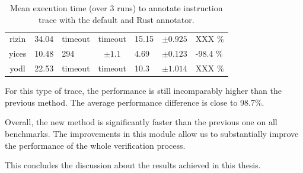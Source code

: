 \begin{table}[h]
{\begin{tabular}{ccgcgcg}
            rizin                                & 34.04                                & timeout                                   & timeout                                & 15.15                     & $ \pm 0.925 $ & XXX \%    \\
            yices                                & 10.48                                & 294                                       & $ \pm 1.1 $                            & 4.69                      & $ \pm 0.123 $ & -98.4 \%  \\
            yodl                                 & 22.53                                & timeout                                   & timeout                                & 10.3                      & $ \pm 1.014 $ & XXX \%    \\
            \bottomrule
        \end{tabular}
    }
    \caption{Mean execution time (over 3 runs) to annotate instruction trace with the default and Rust annotator.}
    \label{table:annotate-instruction-trace-3}
\end{table}

For this type of trace, the performance is still incomparably higher than the previous method. The average performance difference is close to 98.7\%.

Overall, the new method is significantly faster than the previous one on all benchmarks. The improvements in this module allow us to substantially improve the performance of the whole verification process.

This concludes the discussion about the results achieved in this thesis.
